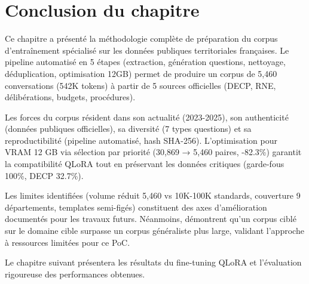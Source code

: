 \section{Conclusion du chapitre}

Ce chapitre a présenté la méthodologie complète de préparation du corpus d'entraînement spécialisé sur les données publiques territoriales françaises. Le pipeline automatisé en 5 étapes (extraction, génération questions, nettoyage, déduplication, optimisation 12GB) permet de produire un corpus de 5,460 conversations (542K tokens) à partir de 5 sources officielles (DECP, RNE, délibérations, budgets, procédures).

Les forces du corpus résident dans son actualité (2023-2025), son authenticité (données publiques officielles), sa diversité (7 types questions) et sa reproductibilité (pipeline automatisé, hash SHA-256). L'optimisation pour VRAM 12 GB via sélection par priorité (30,869 → 5,460 paires, -82.3\%) garantit la compatibilité QLoRA tout en préservant les données critiques (garde-fous 100\%, DECP 32.7\%).

Les limites identifiées (volume réduit 5,460 vs 10K-100K standards, couverture 9 départements, templates semi-figés) constituent des axes d'amélioration documentés pour les travaux futurs. Néanmoins, \citet{gururangan2020dont} démontrent qu'un corpus ciblé sur le domaine cible surpasse un corpus généraliste plus large, validant l'approche à ressources limitées pour ce PoC.

Le chapitre suivant présentera les résultats du fine-tuning QLoRA et l'évaluation rigoureuse des performances obtenues.
